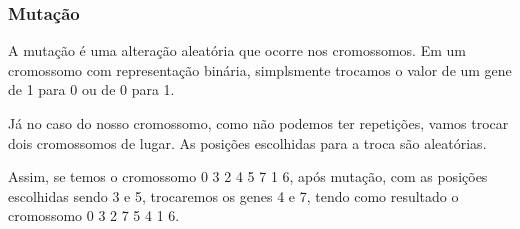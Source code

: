 \documentclass[a4paper,12pt]{article}
\begin{document}
  \subsubsection{Mutação}
  A mutação é uma alteração aleatória que ocorre nos cromossomos. Em um
  cromossomo com representação binária, simplsmente trocamos o valor de um gene
  de 1 para 0 ou de 0 para 1.

  Já no caso do nosso cromossomo, como não podemos ter repetições, vamos trocar
  dois cromossomos de lugar. As posições escolhidas para a troca são aleatórias.

  Assim, se temos o cromossomo 0 3 2 4 5 7 1 6, após mutação, com as posições
  escolhidas sendo 3 e 5, trocaremos os genes 4 e 7, tendo como resultado o
  cromossomo 0 3 2 7 5 4 1 6.
\end{document}
